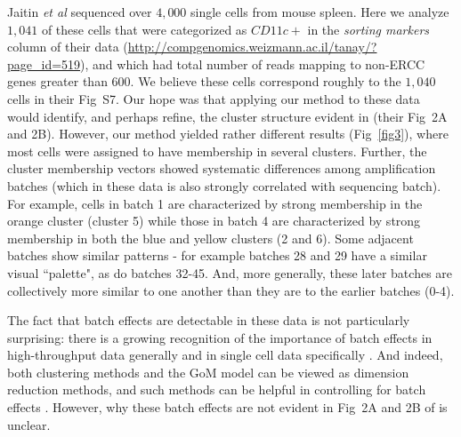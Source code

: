 \documentclass[10pt,letterpaper]{article}
\begin{document}
Jaitin \textit{et al} sequenced over $4,000$ single cells from mouse spleen. Here we analyze $1,041$ of these cells that were categorized as $CD11c+$ in the \textit{sorting markers} column of their data (\url{http://compgenomics.weizmann.ac.il/tanay/?page_id=519}), and which had total number of reads mapping to non-ERCC genes greater than $600$. We believe these cells correspond roughly to the $1,040$ cells in their Fig~S7.   Our hope was that applying our method to these data would identify, and perhaps refine, the cluster structure evident in
\cite{Jaitin2014} (their Fig~2A and 2B). However, our method yielded rather different results (Fig~\ref{fig3}), where most cells were assigned to have membership in several clusters. Further, the cluster membership vectors showed systematic differences among amplification batches (which in these data is also strongly correlated with sequencing batch). For example, cells in batch 1 are characterized by strong membership in the orange cluster (cluster 5) while those in batch 4 are characterized
by strong membership in both the blue and yellow clusters (2 and 6). Some adjacent batches show similar patterns - for example batches 28 and 29 have a similar visual ``palette", as do batches 32-45. And, more generally, these later batches are collectively more similar to one another than they are to the earlier batches (0-4).



The fact that batch effects are detectable in these data is not particularly surprising: there is a growing recognition of the importance of batch effects in high-throughput data generally \cite{Leek2010} and in single cell data specifically \cite{Hicks2015}. And indeed, both clustering methods and the GoM model can be viewed as dimension reduction methods, and such methods can be helpful in controlling for batch effects \cite{Leek2007, Stegle2012}. However, why these batch effects are not evident in Fig~2A and 2B of \cite{Jaitin2014} is unclear.
\end{document}
